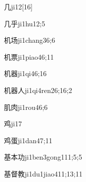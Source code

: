 
\begin{verbete}{几}{ji1}{2}[16]
\end{verbete}

\begin{verbete}{几乎}{ji1hu1}{2;5}
\end{verbete}

\begin{verbete}{机场}{ji1chang3}{6;6}
\end{verbete}

\begin{verbete}{机票}{ji1piao4}{6;11}
\end{verbete}

\begin{verbete}{机器}{ji1qi4}{6;16}
\end{verbete}

\begin{verbete}{机器人}{ji1qi4ren2}{6;16;2}
\end{verbete}

\begin{verbete}{肌肉}{ji1rou4}{6;6}
\end{verbete}

\begin{verbete}{鸡}{ji1}{7}
\end{verbete}

\begin{verbete}{鸡蛋}{ji1dan4}{7;11}
\end{verbete}

\begin{verbete}{基本功}{ji1ben3gong1}{11;5;5}
\end{verbete}

\begin{verbete}{基督教}{ji1du1jiao4}{11;13;11}
\end{verbete}

